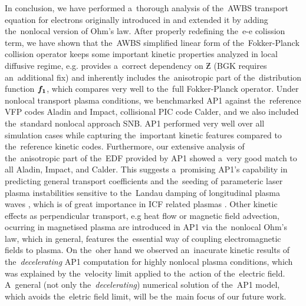 In conclusion, we have performed a~thorough analysis of the~AWBS transport 
equation for electrons originally introduced in \cite{Sorbo_2015} and extended
it by adding the~nonlocal version of Ohm's law.
After properly redefining the~e-e colission term, we have shown that the~AWBS
simplified linear form of the~Fokker-Planck collision operator keeps
some important kinetic properties analyzed in local diffusive regime, 
e.g. provides a~correct dependency 
on $\Zbar$ (BGK requires an~additional fix) and inherently includes
the~anisotropic part of the~distribution function ${\boldsymbol{f_1}}$, which compares
very well to the~full Fokker-Planck operator.
Under nonlocal transport plasma conditions, we benchmarked AP1 against 
the~reference VFP codes Aladin and Impact, collisional PIC code Calder, 
and we also included the~standard nonlocal approach SNB.
AP1 performed very well over all simulation cases while capturing the~important
kinetic features compared to the~reference kinetic codes. 
Furthermore, our extensive analysis of the~anisotropic part of the~EDF 
provided by AP1 showed a~very good match to all Aladin, Impact, and Calder. 
This suggests 
a~promising AP1's capability in predicting general transport coefficients and 
the~seeding of parameteric laser plasma instabilities sensitive 
to the~Landau damping of longitudinal plasma waves 
\cite{goldston1995introduction, Sorbo_2015},
which is of great importance in ICF related plasmas 
\cite{Kirkwood_NIFLPI_PPCF2013}.
Other kinetic effects as perpendicular transport, e.g heat flow
or magnetic field advection, ocurring in magnetised plasma  
\cite{Walsh_Nernst_PRL2017} are introduced in
AP1 via the~nonlocal Ohm's law, which in general, features the~essential way
of coupling electromagnetic fields to plasma.
On the~oher hand we observed an~inacurate kinetic results of 
the~\textit{decelerating} AP1 computation for highly nonlocal plasma 
conditions, which was explained by the~velocity limit applied to the~action
of the~electric field. A~general (not only the~\textit{decelerating}) numerical
solution of the~AP1 model, which avoids the~eletric field limit, 
will be the~main focus of our future work.
